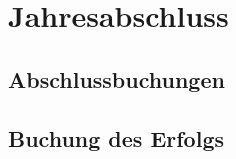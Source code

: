 \documentclass[paper=a4, fontsize=11pt]{scrartcl}
\numberwithin{equation}{section}
\numberwithin{figure}{section}
\numberwithin{table}{section}
\begin{document}

\newpage

\section{Jahresabschluss}


\subsection{Abschlussbuchungen}


\subsection{Buchung des Erfolgs}

\end{document}
